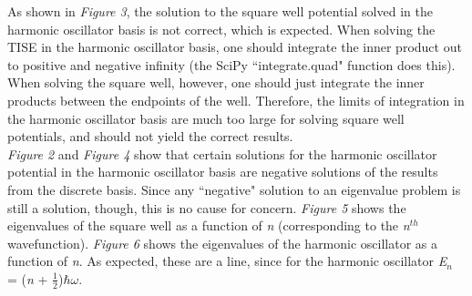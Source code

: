 \documentclass[%
 reprint,
 amsmath,amssymb,
 aps,
]{revtex4-1}
\begin{document}
\noindent As shown in \textit{Figure 3}, the solution to the square well potential solved in the harmonic oscillator basis is not correct, which is expected.  When solving the TISE in the harmonic oscillator basis, one should integrate the inner product out to positive and negative infinity (the SciPy ``integrate.quad" function does this).  When solving the square well, however, one should just integrate the inner products between the endpoints of the well.  Therefore, the limits of integration in the harmonic oscillator basis are much too large for solving square well potentials, and should not yield the correct results.\\

\noindent \textit{Figure 2} and \textit{Figure 4} show that certain solutions for the harmonic oscillator potential in the harmonic oscillator basis are negative solutions of the results from the discrete basis.  Since any ``negative" solution to an eigenvalue problem is still a solution, though, this is no cause for concern.  \textit{Figure 5} shows the eigenvalues of the square well as a function of \textit{n} (corresponding to the \textit{n}$^{th}$ wavefunction).  \textit{Figure 6} shows the eigenvalues of the harmonic oscillator as a function of \textit{n}.  As expected, these are a line, since for the harmonic oscillator \textit{E}$_n$ = (\textit{n} + $\frac{1}{2}$)$\hbar\omega$.\\
\end{document}
